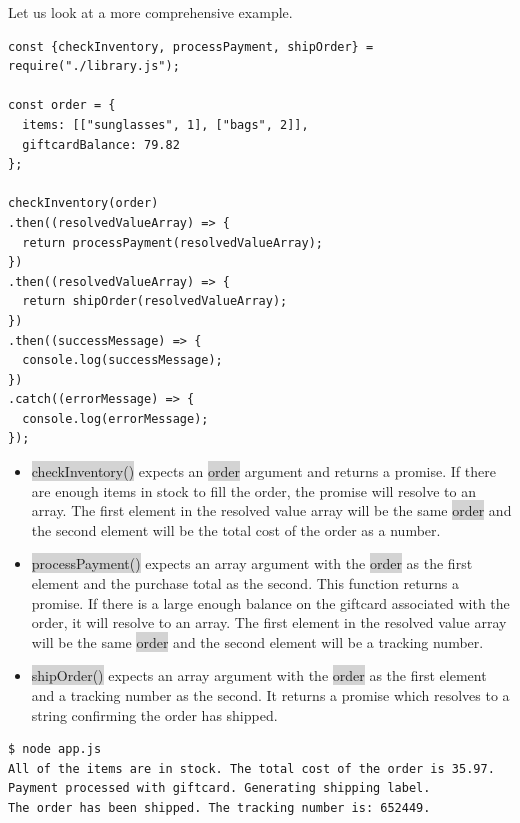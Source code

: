 \documentclass[11pt]{article}
\begin{document}
\newline
Let us look at a more comprehensive example. 
\begin{lstlisting}
const {checkInventory, processPayment, shipOrder} = require("./library.js");

const order = {
  items: [["sunglasses", 1], ["bags", 2]],
  giftcardBalance: 79.82
};

checkInventory(order)
.then((resolvedValueArray) => {
  return processPayment(resolvedValueArray); 
})
.then((resolvedValueArray) => {
  return shipOrder(resolvedValueArray); 
})
.then((successMessage) => {
  console.log(successMessage);
})
.catch((errorMessage) => {
  console.log(errorMessage);
});
\end{lstlisting}
\begin{itemize}[leftmargin = *]
\item \colorbox{lightgray}{checkInventory()} expects an \colorbox{lightgray}{order} argument and returns a promise. If there are enough items in stock to fill the order, the promise will resolve to an array. The first element in the resolved value array will be the same \colorbox{lightgray}{order} and the second element will be the total cost of the order as a number. 
\item \colorbox{lightgray}{processPayment()} expects an array argument with the \colorbox{lightgray}{order} as the first element and the purchase total as the second. This function returns a promise. If there is a large enough balance on the giftcard associated with the order, it will resolve to an array. The first element in the resolved value array will be the same \colorbox{lightgray}{order} and the second element will be a tracking number. 
\item \colorbox{lightgray}{shipOrder()} expects an array argument with the \colorbox{lightgray}{order} as the first element and a tracking number as the second. It returns a promise which resolves to a string confirming the order has shipped.
\end{itemize}
\begin{lstlisting}[basicstyle=\small\ttfamily\color{theWhite}, backgroundcolor = \color{theBlack}, language = Comment]
$ node app.js
All of the items are in stock. The total cost of the order is 35.97.
Payment processed with giftcard. Generating shipping label.
The order has been shipped. The tracking number is: 652449.
\end{lstlisting}
\end{document}
